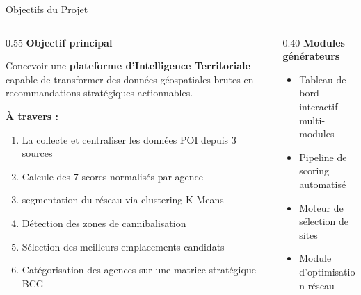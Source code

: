 \documentclass[aspectratio=169, 9pt]{beamer}
\begin{document}
\begin{frame}{Objectifs du Projet}
  \vspace{0.2cm}
  \begin{columns}[T]
    \begin{column}{0.55\textwidth}
      {\color{AccentOrange}\faBullseye} \textbf{Objectif principal}

      \vspace{0.2cm}
      Concevoir une \textbf{plateforme d'Intelligence Territoriale} capable de transformer des données géospatiales brutes en recommandations stratégiques actionnables.

      \vspace{0.4cm}
      \textbf{À travers :}
      \begin{enumerate}
        \item La collecte et centraliser les données POI depuis 3 sources
        \item Calcule des 7 scores normalisés par agence
        \item segmentation du réseau via clustering K-Means
        \item Détection des zones de cannibalisation
        \item Sélection des meilleurs emplacements candidats
        \item Catégorisation des agences sur une matrice stratégique BCG
      \end{enumerate}
    \end{column}
    \begin{column}{0.40\textwidth}
      {\color{AccentBlue}\faCogs} \textbf{Modules générateurs}
      
      \vspace{0.2cm}
      \begin{itemize}
        \item Tableau de bord interactif multi-modules
        \item Pipeline de scoring automatisé
        \item Moteur de sélection de sites
        \item Module d'optimisation réseau
      \end{itemize}
    \end{column}
  \end{columns}
\end{frame}
\end{document}
